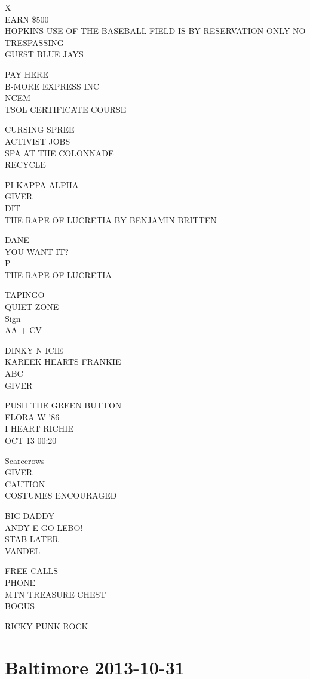 \documentclass[10pt,letterpaper]{article}
\begin{document}
X\\
EARN \$500\\
HOPKINS USE OF THE BASEBALL FIELD IS BY RESERVATION ONLY NO TRESPASSING\\
GUEST BLUE JAYS

PAY HERE\\
B{-}MORE EXPRESS INC\\
NCEM\\
TSOL CERTIFICATE COURSE

CURSING SPREE\\
ACTIVIST JOBS\\
SPA AT THE COLONNADE\\
RECYCLE

PI KAPPA ALPHA\\
GIVER\\
DIT\\
THE RAPE OF LUCRETIA BY BENJAMIN BRITTEN

DANE\\
YOU WANT IT?\\
P\\
THE RAPE OF LUCRETIA

TAPINGO\\
QUIET ZONE\\
Sign\\
AA + CV

DINKY N ICIE\\
KAREEK HEARTS FRANKIE\\
ABC\\
GIVER

PUSH THE GREEN BUTTON\\
FLORA W '86\\
I HEART RICHIE\\
OCT 13 00:20

Scarecrows\\
GIVER\\
CAUTION\\
COSTUMES ENCOURAGED

BIG DADDY\\
ANDY E GO LEBO!\\
STAB LATER\\
VANDEL

FREE CALLS\\
PHONE\\
MTN TREASURE CHEST\\
BOGUS

RICKY PUNK ROCK


\section*{Baltimore 2013-10-31}
\end{document}
